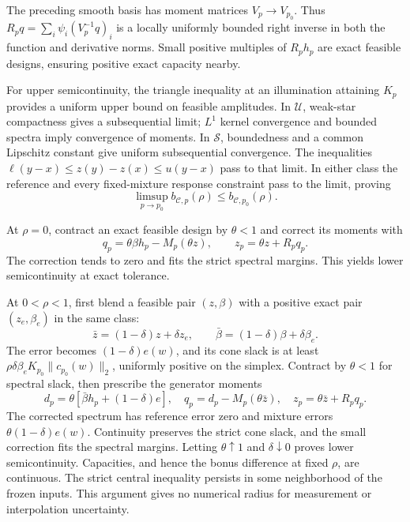 \documentclass[9pt]{osa-supplemental-document}
\begin{document}
The preceding smooth basis has moment matrices $V_p\to V_{p_0}$. Thus $R_pq=\sum_i\psi_i(V_p^{-1}q)_i$ is a locally uniformly bounded right inverse in both the function and derivative norms. Small positive multiples of $R_ph_p$ are exact feasible designs, ensuring positive exact capacity nearby.

For upper semicontinuity, the triangle inequality at an illumination attaining $K_p$ provides a uniform upper bound on feasible amplitudes. In $\mathcal U$, weak-star compactness gives a subsequential limit; $L^1$ kernel convergence and bounded spectra imply convergence of moments. In $\mathcal S$, boundedness and a common Lipschitz constant give uniform subsequential convergence. The inequalities $\ell(y-x)\leq z(y)-z(x)\leq u(y-x)$ pass to that limit. In either class the reference and every fixed-mixture response constraint pass to the limit, proving
\begin{equation}
 \limsup_{p\to p_0}b_{\mathcal C,p}(\rho)\leq b_{\mathcal C,p_0}(\rho).
\end{equation}

At $\rho=0$, contract an exact feasible design by $\theta<1$ and correct its moments with
\begin{equation}
 q_p=\theta\beta h_p-M_p(\theta z),\qquad z_p=\theta z+R_pq_p.
\end{equation}
The correction tends to zero and fits the strict spectral margins. This yields lower semicontinuity at exact tolerance.

At $0<\rho<1$, first blend a feasible pair $(z,\beta)$ with a positive exact pair $(z_e,\beta_e)$ in the same class:
\begin{equation}
 \bar z=(1-\delta)z+\delta z_e,\qquad
 \bar\beta=(1-\delta)\beta+\delta\beta_e.
\end{equation}
The error becomes $(1-\delta)e(w)$, and its cone slack is at least $\rho\delta\beta_eK_{p_0}\|c_{p_0}(w)\|_2$, uniformly positive on the simplex. Contract by $\theta<1$ for spectral slack, then prescribe the generator moments
\begin{equation}
 d_p=\theta[\bar\beta h_p+(1-\delta)e],\quad
 q_p=d_p-M_p(\theta\bar z),\quad
 z_p=\theta\bar z+R_pq_p.
\end{equation}
The corrected spectrum has reference error zero and mixture errors $\theta(1-\delta)e(w)$. Continuity preserves the strict cone slack, and the small correction fits the spectral margins. Letting $\theta\uparrow1$ and $\delta\downarrow0$ proves lower semicontinuity. Capacities, and hence the bonus difference at fixed $\rho$, are continuous. The strict central inequality persists in some neighborhood of the frozen inputs. This argument gives no numerical radius for measurement or interpolation uncertainty.
\end{document}
